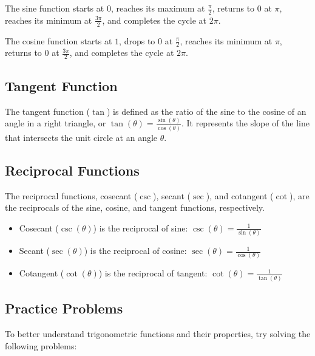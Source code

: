 \documentclass[a4paper,12pt]{book}
\begin{document}
The sine function starts at \(0\), reaches its maximum at \(\frac{\pi}{2}\), returns to \(0\) at \(\pi\), reaches its minimum at \(\frac{3\pi}{2}\), and completes the cycle at \(2\pi\).

The cosine function starts at \(1\), drops to \(0\) at \(\frac{\pi}{2}\), reaches its minimum at \(\pi\), returns to \(0\) at \(\frac{3\pi}{2}\), and completes the cycle at \(2\pi\).

\subsection{Tangent Function}
\label{subsec:tangent_function}
The tangent function (\(\tan\)) is defined as the ratio of the sine to the cosine of an angle in a right triangle, or \(\tan(\theta) = \frac{\sin(\theta)}{\cos(\theta)}\). It represents the slope of the line that intersects the unit circle at an angle \(\theta\).

\subsection{Reciprocal Functions}
\label{subsec:reciprocal_functions}
The reciprocal functions, cosecant (\(\csc\)), secant (\(\sec\)), and cotangent (\(\cot\)), are the reciprocals of the sine, cosine, and tangent functions, respectively.

\begin{itemize}
  \item Cosecant (\(\csc(\theta)\)) is the reciprocal of sine: \(\csc(\theta) = \frac{1}{\sin(\theta)}\)
  \item Secant (\(\sec(\theta)\)) is the reciprocal of cosine: \(\sec(\theta) = \frac{1}{\cos(\theta)}\)
  \item Cotangent (\(\cot(\theta)\)) is the reciprocal of tangent: \(\cot(\theta) = \frac{1}{\tan(\theta)}\)
\end{itemize}


\subsection{Practice Problems}
\label{subsec:practice_problems}

To better understand trigonometric functions and their properties, try solving the following problems:
\end{document}
